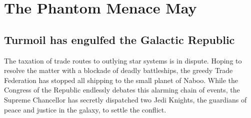 \chapter{The Phantom Menace	May}
\section{Turmoil has engulfed the Galactic Republic}
The taxation of trade routes to outlying star systems is in 
dispute. Hoping to resolve the matter with a blockade of 
deadly battleships, the greedy Trade Federation has stopped 
all shipping to the small planet of Naboo. While the Congress 
of the Republic endlessly debates this alarming chain of 
events, the Supreme Chancellor has secretly dispatched two 
Jedi Knights, the guardians of peace and justice in the 
galaxy, to settle the conflict.

\lipsum[1-10]
\cite{CHAUDHURI_2014}
\cite{MROWCZYNSKI_1998}

\Taa
